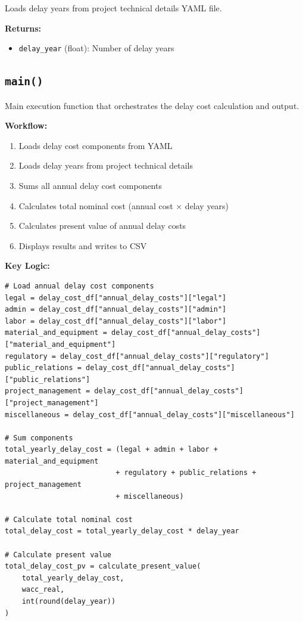 \documentclass[12pt]{article}
\begin{document}
Loads delay years from project technical details YAML file.

\textbf{Returns:}
\begin{itemize}
    \item \texttt{delay\_year} (float): Number of delay years
\end{itemize}

\subsection{\texttt{main()}}

Main execution function that orchestrates the delay cost calculation and output.

\textbf{Workflow:}
\begin{enumerate}
    \item Loads delay cost components from YAML
    \item Loads delay years from project technical details
    \item Sums all annual delay cost components
    \item Calculates total nominal cost (annual cost × delay years)
    \item Calculates present value of annual delay costs
    \item Displays results and writes to CSV
\end{enumerate}

\textbf{Key Logic:}
\begin{lstlisting}
# Load annual delay cost components
legal = delay_cost_df["annual_delay_costs"]["legal"]
admin = delay_cost_df["annual_delay_costs"]["admin"]
labor = delay_cost_df["annual_delay_costs"]["labor"]
material_and_equipment = delay_cost_df["annual_delay_costs"]["material_and_equipment"]
regulatory = delay_cost_df["annual_delay_costs"]["regulatory"]
public_relations = delay_cost_df["annual_delay_costs"]["public_relations"]
project_management = delay_cost_df["annual_delay_costs"]["project_management"]
miscellaneous = delay_cost_df["annual_delay_costs"]["miscellaneous"]

# Sum components
total_yearly_delay_cost = (legal + admin + labor + material_and_equipment 
                          + regulatory + public_relations + project_management 
                          + miscellaneous)

# Calculate total nominal cost
total_delay_cost = total_yearly_delay_cost * delay_year

# Calculate present value
total_delay_cost_pv = calculate_present_value(
    total_yearly_delay_cost,
    wacc_real,
    int(round(delay_year))
)
\end{lstlisting}
\end{document}
